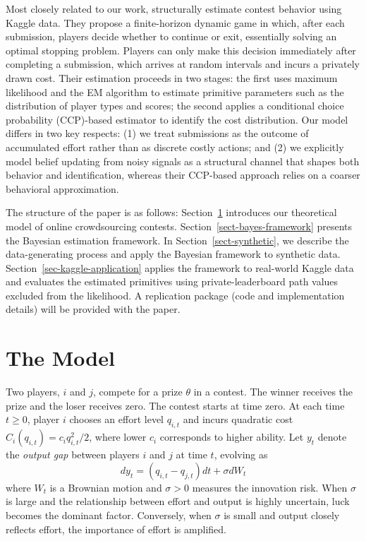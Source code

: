 \documentclass[mnsc]{informs3}
\begin{document}
Most closely related to our work, \citet{lemus2021dynamic} structurally estimate contest behavior using Kaggle data.
They propose a finite-horizon dynamic game in which, after each submission, players decide whether to continue or exit, essentially solving an optimal stopping problem.
Players can only make this decision immediately after completing a submission, which arrives at random intervals and incurs a privately drawn cost.
Their estimation proceeds in two stages: the first uses maximum likelihood and the EM algorithm to estimate primitive parameters such as the distribution of player types and scores; the second applies a conditional choice probability (CCP)-based estimator to identify the cost distribution.
Our model differs in two key respects:
(1) we treat submissions as the outcome of accumulated effort rather than as discrete costly actions; and
(2) we explicitly model belief updating from noisy signals as a structural channel that shapes both behavior and identification, whereas their CCP-based approach relies on a coarser behavioral approximation.







The structure of the paper is as follows:
Section~\ref{contest-theory} introduces our theoretical model of online crowdsourcing contests.
Section~\ref{sect-bayes-framework} presents the Bayesian estimation framework.
In Section~\ref{sect-synthetic}, we describe the data-generating process and apply the Bayesian framework to synthetic data.
Section~\ref{sec-kaggle-application} applies the framework to real-world Kaggle data and evaluates the estimated primitives using private-leaderboard path values excluded from the likelihood.
A replication package (code and implementation details) will be provided with the paper.



\section{The Model}\label{contest-theory}

Two players, $i$ and $j$, compete for a prize $\theta$ in a contest.
The winner receives the prize and the loser receives zero.
The contest starts at time zero.
At each time $t\ge0$, player $i$ chooses an effort level $q_{i,t}$ and incurs quadratic cost $C_i(q_{i,t}) = c_i q_{i,t}^2/2$, where lower $c_i$ corresponds to higher ability.
Let $y_t$ denote the \textit{output gap} between players $i$ and $j$ at time $t$, evolving as
\begin{equation}\label{eq-state-dynamics}
	dy_t = (q_{i,t}-q_{j,t})dt + \sigma dW_t
\end{equation}
where $W_t$ is a Brownian motion and $\sigma>0$ measures the innovation risk.
When $\sigma$ is large and the relationship between effort and output is highly uncertain, luck becomes the dominant factor.
Conversely, when $\sigma$ is small and output closely reflects effort, the importance of effort is amplified.
\end{document}
